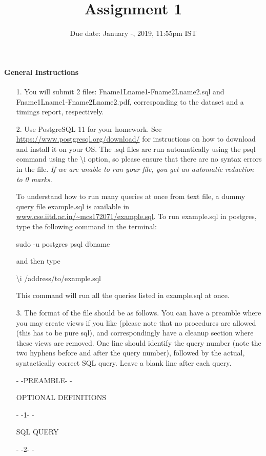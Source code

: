 \documentclass[10pt]{article}
\title{Assignment 1}
\date{Due date: January -, 2019, 11:55pm IST}
\begin{document}
\maketitle
\paragraph*{General Instructions}


\begin{itemize}

\item[1.]You will submit 2 files: Fname1Lname1-Fname2Lname2.sql and Fname1Lname1-Fname2Lname2.pdf, corresponding to the dataset and a timings report, respectively.

\item[2.]Use PostgreSQL 11 for your homework. See \url{https://www.postgresql.org/download/} for instructions
on how to download and install it on your OS. The .sql files are run automatically using the psql command using the \textbackslash i option, so please ensure that there are no syntax errors in the file. {\it If we are unable to run your file, you get an automatic reduction to 0 marks.}


To understand how to run many queries at once from text file, a dummy query file example.sql is available in 
\url{www.cse.iitd.ac.in/~mcs172071/example.sql}. To run example.sql in postgres, type the following command in the terminal:

sudo -u postgres psql dbname

and then type 

\textbackslash i /address/to/example.sql

This command will run all the queries listed in example.sql at once.  

\item[3.] The format of the file should be as follows. You can have a preamble where you may create views if you like (please note that no procedures are allowed (this has to be pure sql), and correspondingly have a cleanup section where these views are removed. One line should identify the query number (note the two hyphens before and after the query number), followed by the actual, syntactically correct SQL
query. Leave a blank line after each query. 

- -PREAMBLE- -

OPTIONAL DEFINITIONS

- -1- -

SQL QUERY

- -2- -


\end{itemize}
\end{document}
